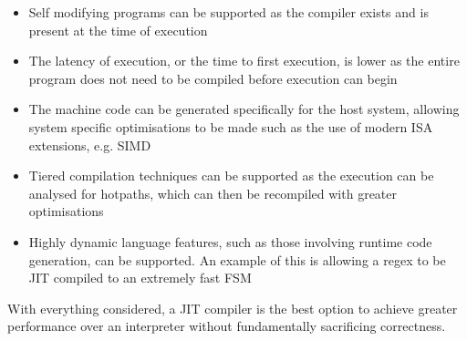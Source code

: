 \begin{itemize}
	\item Self modifying programs can be supported as the compiler exists and is present at the time of execution
	\item The latency of execution, or the time to first execution, is lower as  the entire program does not need to be compiled before execution can begin
	\item The machine code can be generated specifically for the host system, allowing system specific  optimisations to be made such as the use of modern ISA extensions, e.g. SIMD
	\item Tiered compilation techniques can be supported as the execution can be analysed for hotpaths, which can then be recompiled with greater optimisations
	\item Highly dynamic language features, such as those involving runtime code generation, can be supported. An example of this is allowing a regex to be JIT compiled to an extremely fast FSM
\end{itemize}

With everything considered, a JIT compiler is the best option to achieve greater performance over an interpreter without fundamentally sacrificing correctness. 
